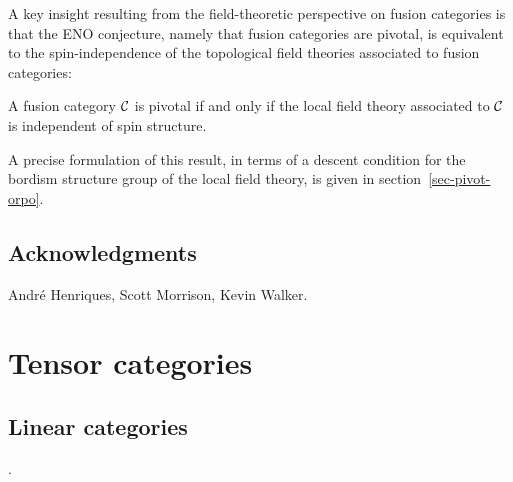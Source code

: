 \documentclass{amsart}
\begin{document}
A key insight resulting from the field-theoretic perspective on fusion categories is that the ENO conjecture, namely that fusion categories are pivotal, is equivalent to the spin-independence of the topological field theories associated to fusion categories:
\begin{theorem}
A fusion category $\mathcal C$ is pivotal if and only if the local field theory associated to $\mathcal C$ is independent of spin structure.
\end{theorem}
A precise formulation of this result, in terms of a descent condition for the bordism structure group of the local field theory, is given in section~\ref{sec-pivot-orpo}.



\subsection*{Acknowledgments}
Andr\'e Henriques, Scott Morrison, Kevin Walker.



\section{Tensor categories} \label{sec-tc}



\subsection{Linear categories} \label{sec-tc-lincat}
.

\begin{definition}
\CDcomm{[2Vect = idempotent complete additive categories enriched in Vect]}
\end{definition}


\end{document}
